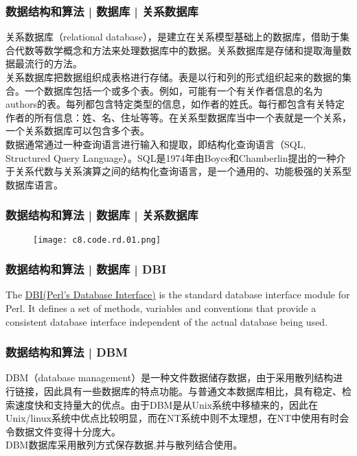 \begin{frame}
  \frametitle{数据结构和算法 | 数据库 | 关系数据库}
关系数据库（relational database），是建立在关系模型基础上的数据库，借助于集合代数等数学概念和方法来处理数据库中的数据。\alert{关系数据库是存储和提取海量数据最流行的方法。}\\
\vspace{1em}
\alert{关系数据库把数据组织成表格进行存储。}表是以\alert{行和列的形式}组织起来的数据的集合。一个数据库包括一个或多个表。例如，可能有一个有关作者信息的名为authors的表。每列都包含特定类型的信息，如作者的姓氏。每行都包含有关特定作者的所有信息：姓、名、住址等等。在关系型数据库当中一个表就是一个关系，一个关系数据库可以包含多个表。\\
\vspace{1em}
数据通常通过一种查询语言进行输入和提取，即\alert{结构化查询语言（SQL, Structured Query Language）}。SQL是1974年由Boyce和Chamberlin提出的一种介于关系代数与关系演算之间的结构化查询语言，是一个通用的、功能极强的关系型数据库语言。
\end{frame}

\begin{frame}
  \frametitle{数据结构和算法 | 数据库 | 关系数据库}
  \begin{figure}
    \centering
    \texttt{[image: c8.code.rd.01.png]}
  \end{figure}
\end{frame}

\begin{frame}
  \frametitle{数据结构和算法 | 数据库 | DBI}
  The \href{http://dbi.perl.org/}{DBI(Perl's Database Interface)} is the standard database interface module for Perl. It defines a set of methods, variables and conventions that provide a consistent database interface independent of the actual database being used. 
\end{frame}

\begin{frame}
  \frametitle{数据结构和算法 | DBM}
  DBM（database management）是一种文件数据储存数据，由于采用散列结构进行链接，因此具有一些数据库的特点功能。与普通文本数据库相比，具有稳定、检索速度快和支持量大的优点。由于DBM是从Unix系统中移植来的，因此在Unix/linux系统中优点比较明显，而在NT系统中则不太理想，在NT中使用有时会令数据文件变得十分庞大。\\
  \vspace{1em}
  DBM数据库采用散列方式保存数据,并与散列结合使用。 
\end{frame}

